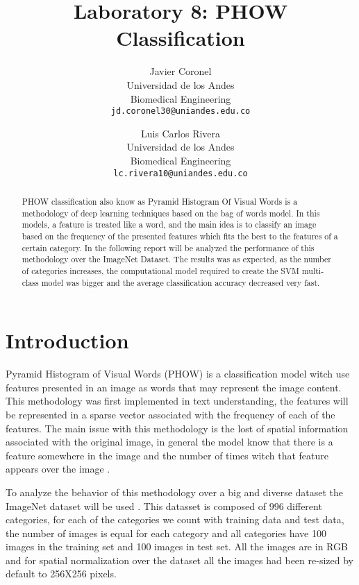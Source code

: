 \documentclass[10pt,twocolumn,letterpaper]{article}
\begin{document}
\title{Laboratory 8: PHOW Classification}

\author{Javier Coronel\\
Universidad de los Andes\\
Biomedical Engineering\\
{\tt\small jd.coronel30@uniandes.edu.co}
\and
Luis Carlos Rivera \\
Universidad de los Andes\\
Biomedical Engineering\\
{\tt\small lc.rivera10@uniandes.edu.co}
}

\maketitle

\begin{abstract}
PHOW classification also know as Pyramid Histogram Of Visual Words is a methodology of deep learning techniques based on the bag of words model. In this models, a feature is treated like a word, and the main idea is to classify an image based on the frequency of the presented features which fits the best to the features of a certain category. In the following report will be analyzed the performance of this methodology over the ImageNet Dataset. The results was as expected, as the number of categories increases, the computational model required to create the SVM multi-class model was bigger and the average classification accuracy decreased very fast.
\end{abstract}

\section{Introduction}

Pyramid Histogram of Visual Words (PHOW) is a classification model witch use features presented in an image as words that may represent the image content. This methodology was first implemented in text understanding, the features will be represented in a sparse vector associated with the frequency of each of the features. The main issue with this methodology is the lost of spatial information associated with the original image, in general the model know that there is a feature somewhere in the image and the number of times witch that feature appears over the image \cite{khaligh2014you}.

To analyze the behavior of this methodology over a big and diverse dataset the ImageNet dataset will be used . This datasset is composed of $996$ different categories, for each of the categories we count with training data and test data, the number of images is equal for each category and all categories have 100 images in the training set and 100 images in test set. All the images are in RGB and for spatial normalization over the dataset all the images had been re-sized by default to 256X256 pixels.
\end{document}
